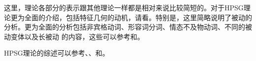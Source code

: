 这里，理论各部分的表示跟其他理论一样都是相对来说比较简短的。对于HPSG理论更为全面的介绍，包括特征几何的动机，请看。\nocite{Mueller99a,Mueller2002b}特别是，这里简略说明了被动的分析。更为全面的分析包括非宾格动词、形容词分词、情态不及物动词、不同的被动变体以及长被动 的内容，这些可以参考和。

HPSG理论的综述可以参考、、和。


